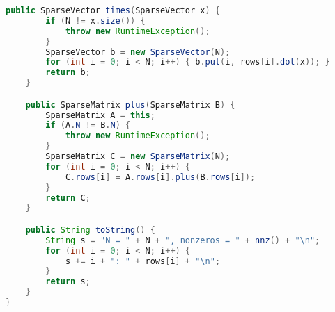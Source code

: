 \documentclass[8pt,a4paper,compress]{beamer}
\begin{document}
\begin{frame}[fragile]
\pause

\begin{lstlisting}[language=Java]
    public SparseVector times(SparseVector x) {
        if (N != x.size()) {
            throw new RuntimeException();
        }
        SparseVector b = new SparseVector(N);
        for (int i = 0; i < N; i++) { b.put(i, rows[i].dot(x)); }
        return b;
    }

    public SparseMatrix plus(SparseMatrix B) {
        SparseMatrix A = this;
        if (A.N != B.N) { 
            throw new RuntimeException(); 
        }
        SparseMatrix C = new SparseMatrix(N);
        for (int i = 0; i < N; i++) { 
            C.rows[i] = A.rows[i].plus(B.rows[i]); 
        }
        return C;
    }

    public String toString() {
        String s = "N = " + N + ", nonzeros = " + nnz() + "\n";
        for (int i = 0; i < N; i++) {
            s += i + ": " + rows[i] + "\n";
        }
        return s;
    }
}
\end{lstlisting}
\end{frame}
\end{document}

